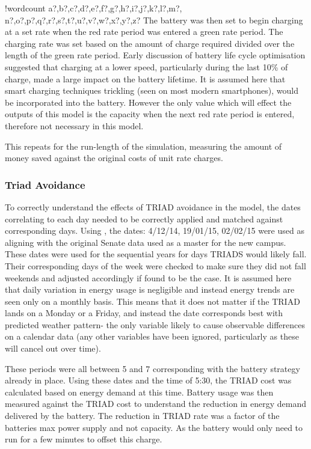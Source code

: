\documentclass[fontsize=9.5pt]{extarticle}
\numberwithin{figure}{section} %
\newcounter{words}
\newenvironment{counted}{%
  \setcounter{words}{0}
  \SearchList!{wordcount}{\stepcounter{words}}
    {a?,b?,c?,d?,e?,f?,g?,h?,i?,j?,k?,l?,m?,
    n?,o?,p?,q?,r?,s?,t?,u?,v?,w?,x?,y?,z?}
  \UndoBoundary{'}
  \SearchOrder{p;}}{%
  \StopSearching}
\begin{document}
\begin{counted}
The battery was then set to begin charging at a set rate when the red
rate period was entered a green rate period. The charging rate was set
based on the amount of charge required divided over the length of the
green rate period. Early discussion of battery life cycle optimisation
suggested that charging at a lower speed, particularly during the last
10\% of charge, made a large impact on the battery lifetime. It is
assumed here that smart charging techniques trickling (seen on most
modern smartphones), would be incorporated into the battery. However the
only value which will effect the outputs of this model is the capacity
when the next red rate period is entered, therefore not necessary in
this model.

This repeats for the run-length of the simulation, measuring the amount
of money saved against the original costs of unit rate charges.

\subsubsection{Triad Avoidance}\label{triad-avoidance}

To correctly understand the effects of TRIAD avoidance in the model, the
dates correlating to each day needed to be correctly applied and matched
against corresponding days. Using \autocite{triad15}, the dates:
4/12/14, 19/01/15, 02/02/15 were used as aligning with the original
Senate data used as a master for the new campus. These dates were used
for the sequential years for days TRIADS would likely fall. Their
corresponding days of the week were checked to make sure they did not
fall weekends and adjusted accordingly if found to be the case. It is
assumed here that daily variation in energy usage is negligible and
instead energy trends are seen only on a monthly basis. This means that
it does not matter if the TRIAD lands on a Monday or a Friday, and
instead the date corresponds best with predicted weather pattern- the
only variable likely to cause observable differences on a calendar data
(any other variables have been ignored, particularly as these will
cancel out over time).

These periods were all between 5 and 7 corresponding with the battery
strategy already in place. Using these dates and the time of 5:30, the
TRIAD cost was calculated based on energy demand at this time. Battery
usage was then measured against the TRIAD cost to understand the
reduction in energy demand delivered by the battery. The reduction in
TRIAD rate was a factor of the batteries max power supply and not
capacity. As the battery would only need to run for a few minutes to
offset this charge.


\end{counted}
\end{document}
